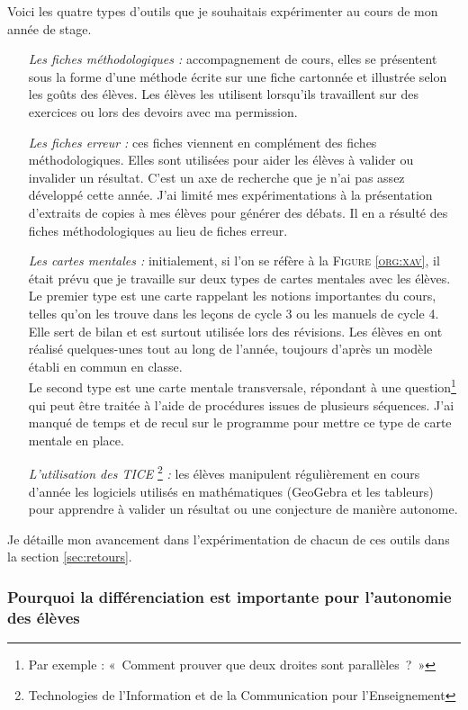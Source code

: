 Voici les quatre types d'outils que je souhaitais expérimenter au cours de mon année de stage.
\begin{itemize}
	\item [\textit{Les fiches méthodologiques :}] accompagnement de cours, elles se présentent sous la forme d'une méthode écrite sur une fiche cartonnée et illustrée selon les goûts des élèves. Les élèves les utilisent lorsqu'ils travaillent sur des exercices ou lors des devoirs avec ma permission.
	\item [\textit{Les fiches erreur :}] ces fiches viennent en complément des fiches méthodologiques. Elles sont utilisées pour aider les élèves à valider ou invalider un résultat. C'est un axe de recherche que je n'ai pas assez développé cette année. J'ai limité mes expérimentations à la présentation d'extraits de copies à mes élèves pour générer des débats. Il en a résulté des fiches méthodologiques au lieu de fiches erreur.
	\item [\textit{Les cartes mentales :}] initialement, si l'on se réfère à la  \textsc{Figure \ref{org:xav}}, il était prévu que je travaille sur deux types de cartes mentales avec les élèves. Le premier type est une carte rappelant les notions importantes du cours, telles qu'on les trouve dans les leçons de cycle 3 ou les manuels de cycle 4. Elle sert de bilan et est surtout utilisée lors des révisions. Les élèves en ont réalisé quelques-unes tout au long de l'année, toujours d'après un modèle établi en commun en classe. \\
	Le second type est une carte mentale transversale, répondant à une question\footnote{Par exemple : « Comment prouver que deux droites sont parallèles ? »} qui peut être traitée à l'aide de procédures issues de plusieurs séquences. J'ai manqué de temps et de recul sur le programme pour mettre ce type de carte mentale en place.
	\item [\textit{L'utilisation des TICE}]\footnote{Technologies de l'Information et de la Communication pour l'Enseignement} \textit{:} les élèves manipulent régulièrement en cours d'année les logiciels utilisés en mathématiques (GeoGebra et les tableurs) pour apprendre à valider un résultat ou une conjecture de manière autonome.
\end{itemize}

Je détaille mon avancement dans l'expérimentation de chacun de ces outils dans la section \ref{sec:retours}.

\subsubsection{Pourquoi la différenciation est importante pour l'autonomie des élèves}

